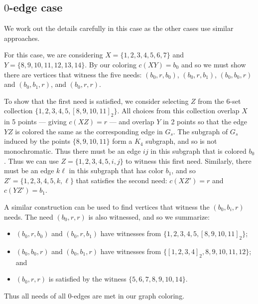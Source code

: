 \documentclass{article}
\theoremstyle{definition}
\begin{document}
\subsection{$0$-edge case}

We work out the details carefully in this case as the other cases use similar
approaches.

For this case, we are considering $X = \{1,2,3,4,5,6,7\}$ and $Y =
\{8,9,10,11,12,13,14\}$. By our coloring $c(XY) =b_{0}$ and so we must show
there are vertices that witness the five needs: $(b_{0},r,b_{0})$,
$(b_{0},r,b_{1})$, $(b_{0},b_{0},r)$ and $(b_{0},b_{1},r)$, and $(b_{0},r,r)$.

To show that the first need is satisfied,
we consider selecting $Z$ from the 6-set collection
$\{1,2,3,4,5,[8,9,10,11]_{2}\}$. All choices from this collection overlap $X$
in 5 points --- giving $c(XZ) = r$ --- and overlap $Y$ in 2 points so that the
edge $YZ$ is colored the same as the corresponding edge in $G_{s}$. The
subgraph of $G_{s}$ induced by the points $\{8,9,10,11\}$ form a $K_{4}$
subgraph, and so is not monochromatic. Thus there must be an edge $ij$ in
this subgraph that is colored $b_{0}$. Thus we can use $Z=\{1,2,3,4,5,i,j\}$ to
witness this first need. Similarly, there must be an edge $k\ell$ in this subgraph
that has color $b_{1}$, and so $Z' = \{1,2,3,4,5,k,\ell\}$ that satisfies the
second need: $c(XZ') = r$ and $c(YZ') = b_{1}$.

A similar construction can be used to find vertices that witness the
$(b_{0},b_{i},r)$ needs.  The need $(b_{0},r,r)$ is also witnessed, and so we
summarize:
\begin{itemize}
\item $(b_{0},r,b_{0})$ and $(b_{0},r,b_{1})$ have witnesses from
  $\{1,2,3,4,5,[8,9,10,11]_{2}\}$; 
\item $(b_{0},b_{0},r)$ and $(b_{0},b_{1},r)$ have witnesses from
  $\{[1,2,3,4]_{2},8,9,10,11,12\}$; and
\item $(b_{0},r,r)$ is satisfied by the witness $\{5,6,7,8,9,10,14\}$.
\end{itemize}
Thus all needs of all $0$-edges are met in our graph coloring.
\end{document}

